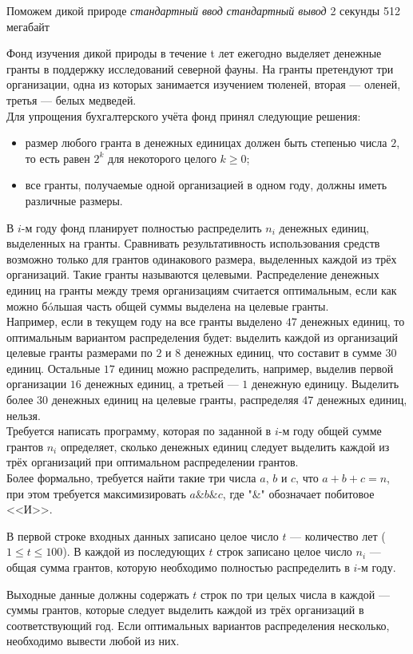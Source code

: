\begin{problem}%
{Поможем дикой природе}%
{\textsl{стандартный ввод}}%
{\textsl{стандартный вывод}}%
{2 секунды}%
{512 мегабайт}{}

Фонд изучения дикой природы в течение t лет ежегодно выделяет денежные гранты в поддержку исследований северной фауны. На гранты претендуют три организации, одна из которых занимается изучением тюленей, вторая — оленей, третья — белых медведей.\\

Для упрощения бухгалтерского учёта фонд принял следующие решения:

\begin{itemize}
\item размер любого гранта в денежных единицах должен быть степенью числа $2$, то есть равен $2^k$ для некоторого целого $k \ge 0$;
\item все гранты, получаемые одной организацией в одном году, должны иметь различные размеры.
\end{itemize}

В $i$-м году фонд планирует полностью распределить $n_i$ денежных единиц, выделенных на гранты. Сравнивать результативность использования средств возможно только для грантов одинакового размера, выделенных каждой из трёх организаций. Такие гранты называются целевыми. Распределение денежных единиц на гранты между тремя организациям считается оптимальным, если как можно б\'{o}льшая часть общей суммы выделена на целевые гранты.\\

Например, если в текущем году на все гранты выделено $47$ денежных единиц, то оптимальным вариантом распределения будет: выделить каждой из организаций целевые гранты размерами по $2$ и $8$ денежных единиц, что составит в сумме $30$ единиц. Остальные $17$ единиц можно распределить, например, выделив первой организации $16$ денежных единиц, а третьей — $1$ денежную единицу. Выделить более $30$ денежных единиц на целевые гранты, распределяя $47$ денежных единиц, нельзя.\\

Требуется написать программу, которая по заданной в $i$-м году общей сумме грантов $n_i$ определяет, сколько денежных единиц следует выделить каждой из трёх организаций при оптимальном распределении грантов.\\

Более формально, требуется найти такие три числа $a$, $b$ и $c$, что $a+b+c=n$, при этом требуется максимизировать $a\&b\&c$, где "\&" обозначает побитовое <<И>>.

\InputFile

В первой строке входных данных записано целое число $t$ — количество лет ($1 \le t \le 100$). В каждой из последующих $t$ строк записано целое число $n_i$ — общая сумма грантов, которую необходимо полностью распределить в $i$-м году.

\OutputFile

Выходные данные должны содержать $t$ строк по три целых числа в каждой — суммы грантов, которые следует выделить каждой из трёх организаций в соответствующий год. Если оптимальных вариантов распределения несколько, необходимо вывести любой из них.

\end{problem}
